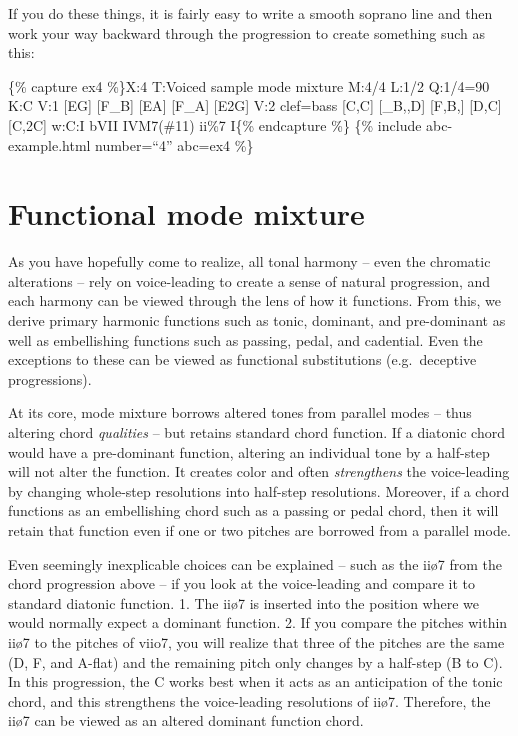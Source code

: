 \documentclass{book}
\begin{document}
If you do these things, it is fairly easy to write a smooth soprano line and
then work your way backward through the progression to create something such
as this:

\{\% capture ex4 \%\}X:4 T:Voiced sample mode mixture M:4/4 L:1/2 Q:1/4=90 K:C
V:1 {[}EG{]} {[}F\_B{]}\textbar{} {[}EA{]} {[}F\_A{]}\textbar{}
{[}E2G{]}\textbar{]} V:2 clef=bass {[}C,C{]} {[}\_B,,D{]}\textbar{} {[}F,B,{]}
{[}D,C{]}\textbar{} {[}C,2C{]}\textbar{]} w:C:I bVII IVM7(\#11) ii\%7 I\{\%
endcapture \%\} \{\% include abc-example.html number=``4'' abc=ex4 \%\}

\hypertarget{functional-mode-mixture}{%
\section{Functional mode mixture}\label{functional-mode-mixture}}

As you have hopefully come to realize, all tonal harmony -- even the chromatic
alterations -- rely on voice-leading to create a sense of natural progression,
and each harmony can be viewed through the lens of how it functions. From
this, we derive primary harmonic functions such as tonic, dominant, and
pre-dominant as well as embellishing functions such as passing, pedal, and
cadential. Even the exceptions to these can be viewed as functional
substitutions (e.g.~deceptive progressions).

At its core, mode mixture borrows altered tones from parallel modes -- thus
altering chord \emph{qualities} -- but retains standard chord function. If a
diatonic chord would have a pre-dominant function, altering an individual tone
by a half-step will not alter the function. It creates color and often
\emph{strengthens} the voice-leading by changing whole-step resolutions into
half-step resolutions. Moreover, if a chord functions as an embellishing chord
such as a passing or pedal chord, then it will retain that function even if
one or two pitches are borrowed from a parallel mode.

Even seemingly inexplicable choices can be explained -- such as the iiø7 from
the chord progression above -- if you look at the voice-leading and compare it
to standard diatonic function. 1. The iiø7 is inserted into the position where
we would normally expect a dominant function. 2. If you compare the pitches
within iiø7 to the pitches of viio7, you will realize that three of the
pitches are the same (D, F, and A-flat) and the remaining pitch only changes
by a half-step (B to C). In this progression, the C works best when it acts as
an anticipation of the tonic chord, and this strengthens the voice-leading
resolutions of iiø7. Therefore, the iiø7 can be viewed as an altered dominant
function chord.
\end{document}
